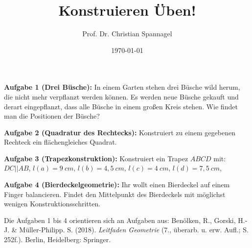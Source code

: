 \documentclass{../cssheet}
\title{Konstruieren Üben!}
\author{Prof. Dr. Christian Spannagel}
\date{\today}
\begin{document}
\printtitle

\textbf{Aufgabe 1 (Drei Büsche):}  In einem Garten stehen drei Büsche wild herum, die nicht mehr verpflanzt werden können. Es werden neue Büsche gekauft und derart eingepflanzt, dass alle Büsche in einem großen Kreis stehen. Wie findet man die Positionen der Büsche?

\textbf{Aufgabe 2 (Quadratur des Rechtecks):}  Konstruiert zu einem gegebenen Rechteck ein flächengleiches Quadrat.

\textbf{Aufgabe 3 (Trapezkonstruktion):}  Konstruiert ein Trapez $ABCD$ mit:\\ $DC || AB$, $l(a)=9~cm$, $l(b)=4,5~cm$, $l(c)=4~cm$, $l(d)=7,5~cm$, 

\textbf{Aufgabe 4 (Bierdeckelgeometrie):}  Ihr wollt einen Bierdeckel auf einem Finger balancieren. Findet den Mittelpunkt des Bierdeckels mit möglichst wenigen Konstruktionsschritten. 

\vspace*{5cm}
Die Aufgaben 1 bis 4 orientieren sich an Aufgaben aus: Benölken, R., Gorski, H.-J. \& Müller-Philipp. S. (2018). \emph{Leitfaden Geometrie} (7., überarb. u. erw. Aufl.; S. 252f.). Berlin, Heidelberg: Springer.


\vspace*{10mm}

\printlicense

\printsocials
\end{document}
